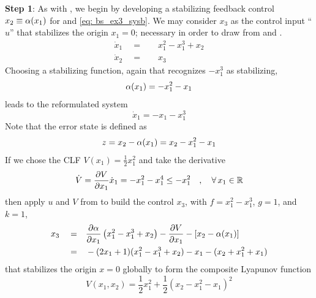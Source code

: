\documentclass[12pt]{ucthesis}
\begin{document}
\begin{eg}
	\noindent \textbf{Step 1}: As with , we begin by developing a stabilizing feedback control $x_2 \equiv \alpha(x_1)$ for  and \ref{eq: bs_ex3_sysb}. We may consider $x_3$ as the control input ``$u$''  that stabilizes the origin $x_1=0$; necessary in order to draw from  and .
		\begin{subequations} \label{eq: bs_ex3_sys1}
			\begin{align} 
				\dot{x}_1 \quad =& \quad x_1^2 - x_1^3 + x_2 \\
				\dot{x}_2 \quad =& \quad x_3
			\end{align}
		\end{subequations}
	Choosing a stabilizing function, again that recognizes $-x_1^3$ as stabilizing,
		\begin{equation} \label{eq: bs_ex3_step1}
			\alpha(x_1) = -x_1^2 - x_1
		\end{equation}
	leads to the reformulated system
		\begin{equation} \label{eq: bs_ex3_sysaa}
			\dot{x}_1 = -x_1 - x_1^3
		\end{equation}
	Note that the error state is defined as
		\begin{equation} \label{eq: bs_ex3_step2}
			z = x_2 - \alpha(x_1) = x_2  -x_1^2 - x_1
		\end{equation}
	\indent If we chose the CLF $V(x_1) = \displaystyle \frac{1}{2}x_1^2$ and take the derivative
		\begin{equation} \label{eq: bs_ex3_V1}
			\dot{V} = \frac{\partial V}{\partial x_1}\dot{x}_1 =-x_1^2 -x_1^4 \leq -x_1^2 \quad,\quad \forall \, x_1 \in \mathbb{R}
		\end{equation}
	then apply $u$ and $V$ from  to build the control $x_3$, with $f=x_1^2 - x_1^3$, $g=1$, and $k=1$,
		\begin{equation} \label{eq: bs_ex3_3a}
		\begin{aligned}
			x_3	\quad =& \quad \frac{\partial\alpha}{\partial x_1}\left( x_1^2 - x_1^3 + x_2 \right) - \frac{\partial V}{\partial x_1} - [x_2 - \alpha(x_1)] \\
				\quad =& \quad -(2x_1 + 1)(x_1^2 - x_1^3 + x_2) - x_1 - (x_2 + x_1^2 + x_1)
		\end{aligned}
		\end{equation}
	that stabilizes the origin $x=0$ globally to form the composite Lyapunov function
		\begin{equation} \label{eq: bs_ex3_step3b}
			V(x_1,x_2) = \frac{1}{2}x_1^2 + \frac{1}{2}(x_2  -x_1^2 - x_1)^2
		\end{equation}	
	

\end{eg}
\end{document}
